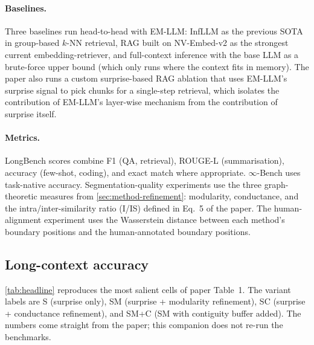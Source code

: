 \paragraph{Baselines.}
Three baselines run head-to-head with EM-LLM: InfLLM \cite{xiao2024infllm} as the previous SOTA in group-based $k$-NN retrieval, RAG built on NV-Embed-v2 \cite{lee2024nvembed} as the strongest current embedding-retriever, and full-context inference with the base LLM as a brute-force upper bound (which only runs where the context fits in memory). The paper also runs a custom surprise-based RAG ablation that uses EM-LLM's surprise signal to pick chunks for a single-step retrieval, which isolates the contribution of EM-LLM's layer-wise mechanism from the contribution of surprise itself.

\paragraph{Metrics.}
LongBench scores combine F1 (QA, retrieval), ROUGE-L (summarisation), accuracy (few-shot, coding), and exact match where appropriate. $\infty$-Bench uses task-native accuracy. Segmentation-quality experiments use the three graph-theoretic measures from \cref{sec:method-refinement}: modularity, conductance, and the intra/inter-similarity ratio (I/IS) defined in Eq.\ 5 of the paper. The human-alignment experiment uses the Wasserstein distance between each method's boundary positions and the human-annotated boundary positions.

\subsection{Long-context accuracy}
\label{sec:eval-longcontext}

\cref{tab:headline} reproduces the most salient cells of paper Table~1. The variant labels are S (surprise only), SM (surprise + modularity refinement), SC (surprise + conductance refinement), and SM+C (SM with contiguity buffer added). The numbers come straight from the paper; this companion does not re-run the benchmarks.


